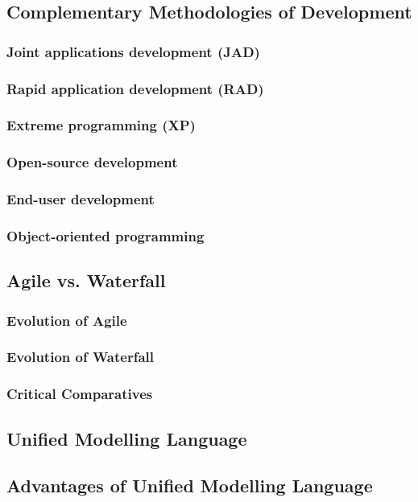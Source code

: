 \documentclass[a4paper,12pt]{article}
\begin{document}
\subsection {Complementary Methodologies of Development}

\subsubsection {Joint applications development (JAD)}
\subsubsection {Rapid application development (RAD)}
\subsubsection {Extreme programming (XP)}
\subsubsection {Open-source development}
\subsubsection {End-user development}
\subsubsection {Object-oriented programming}

\subsection {Agile vs. Waterfall}
\subsubsection {Evolution of Agile}
\subsubsection {Evolution of Waterfall}
\subsubsection {Critical Comparatives}
\subsection {Unified Modelling Language}
\subsection {Advantages of Unified Modelling Language}
\end{document}
